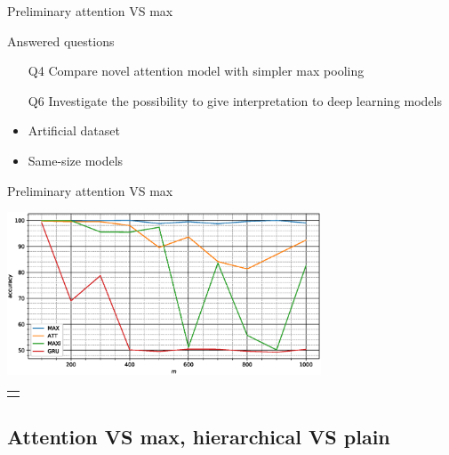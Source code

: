 \begin{frame}{Preliminary attention VS max}
  \begin{block}{Answered questions}
  \begin{itemize}
  \item[Q4] \alert{Compare} novel \alert{attention} model with simpler
    max pooling
  \item[Q6] \alert{Investigate} the possibility to give
    \alert{interpretation} to deep learning models
  \end{itemize}
\end{block}
\begin{itemize}
\item \alert{Artificial} dataset
\item \alert{Same-size} models
\end{itemize}
\end{frame}

\begin{frame}{Preliminary attention VS max}
  \begin{center}
  \includegraphics[width=0.7\textwidth]{imgMax/maxBaseDiff.eps}    
  \footnotesize
  \begin{tabular}{|p{\floatwidth}|}
    \hline
    \\
    \hline
    \\
    \hline
  \end{tabular}
\end{center}
\end{frame}


\subsection{Attention VS max, hierarchical VS plain}


